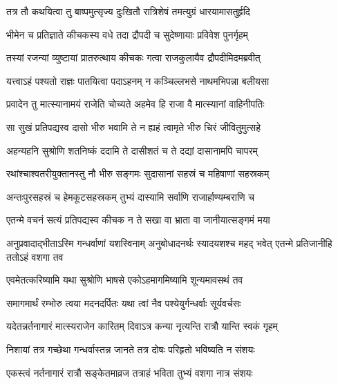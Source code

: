 
\twolineshloka
{तत्र तौ कथयित्वा तु बाष्पमुत्सृज्य दुःखितौ}
{रात्रिशेषं तमत्युग्रं धारयामासतुर्हृदि}


\twolineshloka
{भीमेन च प्रतिज्ञाते कीचकस्य वधे तदा}
{द्रौपदी च सुदेष्णायाः प्रविवेश पुनर्गृहम्}


\twolineshloka
{तस्यां रजन्यां व्युष्टायां प्रातरुत्थाय कीचकः}
{गत्वा राजकुलायैव द्रौपदीमिदमब्रवीत्}


\twolineshloka
{यत्त्वाऽहं पश्यतो राज्ञः पातयित्वा पदाऽहनम्}
{न कञ्चिल्लभसे नाथमभिपन्ना बलीयसा}


\twolineshloka
{प्रवादेन तु मात्स्यानामयं राजेति चोच्यते}
{अहमेव हि राजा वै मात्स्यानां वाहिनीपतिः}


\twolineshloka
{सा सुखं प्रतिपद्यस्व दासो भीरु भवामि ते}
{न ह्यहं त्वामृते भीरु चिरं जीवितुमुत्सहे}


\twolineshloka
{अहन्यहनि सुश्रोणि शतनिष्कं ददामि ते}
{दासीशतं च ते दद्यां दासानामपि चापरम्}


\twolineshloka
{रथांश्चाश्वतरीयुक्तानस्तु नौ भीरु सङ्गमः}
{सुदासानां सहस्रं च महिषाणां सहस्रकम्}


\twolineshloka
{अन्तःपुरसहस्रं च हेमकूटसहस्रकम्}
{तुभ्यं दास्यामि सर्वाणि राजार्हाण्यम्बराणि च}




\twolineshloka
{एतन्मे वचनं सत्यं प्रतिपद्यस्व कीचक}
{न ते सखा वा भ्राता वा जानीयात्सङ्गमं मया}


\threelineshloka
{अनुप्रवादाद्भीताऽस्मि गन्धर्वाणां यशस्विनाम्}
{अनुबोधादनर्थः स्यादयशश्च महद् भवेत्}
{एतन्मे प्रतिजानीहि ततोऽहं वशगा तव}




\twolineshloka
{एवमेतत्करिष्यामि यथा सुश्रोणि भाषसे}
{एकोऽहमागमिष्यामि शून्यमावसथं तव}


\twolineshloka
{समागमार्थं रम्भोरु त्वया मदनदर्पितः}
{यथा त्वां नैव पश्येयुर्गन्धर्वाः सूर्यवर्चसः}




\twolineshloka
{यदेतन्नर्तनागारं मात्स्यराजेन कारितम्}
{दिवाऽत्र कन्या नृत्यन्ति रात्रौ यान्ति स्वकं गृहम्}


\twolineshloka
{निशायां तत्र गच्छेथा गन्धर्वास्तन्न जानते}
{तत्र दोषः परिहृतो भविष्यति न संशयः}


\twolineshloka
{एकस्त्वं नर्तनागारं रात्रौ सङ्केतमाव्रज}
{तत्राहं भविता तुभ्यं वशगा नात्र संशयः}

